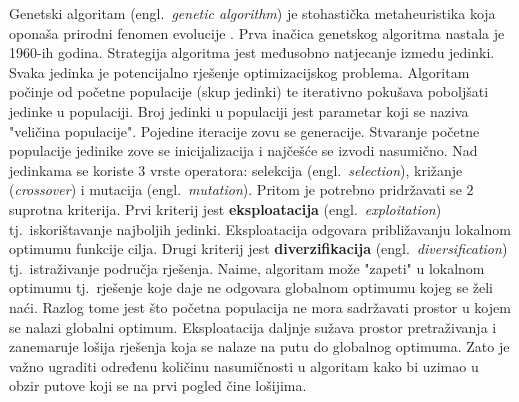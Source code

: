 \documentclass[times, utf8, diplomski]{fer}
\begin{document}
Genetski algoritam (engl.~\textit{genetic algorithm}) je stohastička metaheuristika koja oponaša prirodni fenomen evolucije \cite{book:evolution}. Prva inačica genetskog algoritma nastala je 1960-ih godina. Strategija algoritma jest međusobno natjecanje izmedu jedinki. Svaka jedinka je potencijalno rješenje optimizacijskog problema. Algoritam počinje od početne populacije (skup jedinki) te iterativno pokušava poboljšati jedinke u populaciji. Broj jedinki u populaciji jest parametar koji se naziva "veličina populacije". Pojedine iteracije zovu se generacije. Stvaranje početne populacije jedinike zove se inicijalizacija i najčešće se izvodi nasumično. Nad jedinkama se koriste $3$ vrste operatora: selekcija (engl.~\textit{selection}), križanje (\textit{crossover}) i mutacija (engl.~\textit{mutation}). Pritom je potrebno pridržavati se $2$ suprotna kriterija. Prvi kriterij jest \textbf{eksploatacija} (engl.~\textit{exploitation}) tj.~iskorištavanje najboljih jedinki. Eksploatacija odgovara približavanju lokalnom optimumu funkcije cilja. Drugi kriterij jest \textbf{diverzifikacija} (engl.~\textit{diversification}) tj.~istraživanje područja rješenja. Naime, algoritam može "zapeti" u lokalnom optimumu tj.~rješenje koje daje ne odgovara globalnom optimumu kojeg se želi naći. Razlog tome jest što početna populacija ne mora sadržavati prostor u kojem se nalazi globalni optimum. Eksploatacija daljnje sužava prostor pretraživanja i zanemaruje lošija rješenja koja se nalaze na putu do globalnog optimuma. Zato je važno ugraditi određenu količinu nasumičnosti u algoritam kako bi uzimao u obzir putove koji se na prvi pogled čine lošijima.
\end{document}
